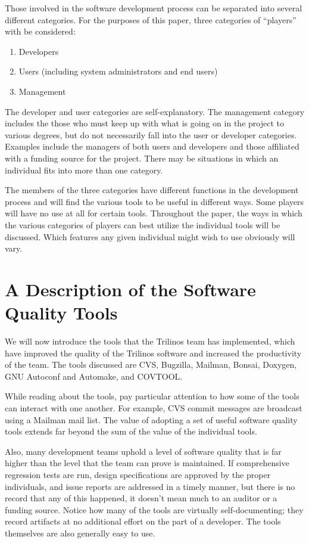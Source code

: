 \documentclass[12pt,relax]{article}
\begin{document}
Those involved in the software development process can be separated into 
several different categories.  For the purposes of this paper, three 
categories of ``players'' with be considered: 
\begin{enumerate}
\item Developers
\item Users (including system administrators and end users)
\item Management
\end{enumerate}

The developer and user 
categories are self-explanatory.  The management category includes the those 
who must keep up with what is going on in the project to various degrees, but 
do not necessarily fall into the user or developer categories.  
Examples include the managers of both users and developers and those 
affiliated with a funding source for the project.  There may be situations 
in which an individual fits into more than one category.

The members of the three categories have different functions in the 
development process and will find the various tools to be useful 
in different ways.  Some players will have no use at all for certain tools.
Throughout the paper, the ways in which the various categories of players 
can best utilize the individual tools will be discussed.  Which features any 
given individual might wish to use obviously will vary.

\section{A Description of the Software Quality Tools}
\label{Section:CommunicationTools}

We will now introduce the tools that the Trilinos team has implemented, 
which have improved the quality of the Trilinos software and increased the 
productivity of the team.  The tools discussed are CVS, Bugzilla, Mailman, 
Bonsai, Doxygen, GNU Autoconf and Automake, and COVTOOL.

While reading about the tools, pay 
particular attention to how some of the tools can interact with one another.
For example, CVS commit messages are broadcast using a Mailman mail list.
The value of adopting a set of useful software quality tools extends far 
beyond the sum of the value of the individual tools.

Also, many development teams uphold a level of software quality that is far 
higher than the level that the team can prove is maintained.  If comprehensive
regression tests are run, design specifications are approved by the 
proper individuals, and issue reports are addressed in a timely manner, but 
there is no record that any of this happened, it doesn't mean much to an 
auditor or a funding source.  Notice how many of the tools are virtually
self-documenting; they record artifacts at no additional effort on the part of 
a developer.  The tools themselves are also generally easy to use. 
\end{document}
